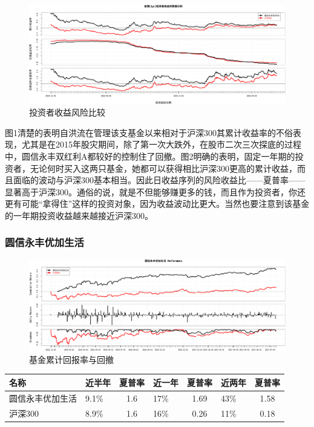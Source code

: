 \documentclass[hyperref,]{ctexart}
\begin{document}
\begin{figure}[htbp]
\centering
\includegraphics{hongliu-details_files/figure-latex/unnamed-chunk-3-1.pdf}
\caption{投资者收益风险比较}
\end{figure}

图1清楚的表明自洪流在管理该支基金以来相对于沪深300其累计收益率的不俗表现，尤其是在2015年股灾期间，除了第一次大跌外，在股市二次三次探底的过程中，圆信永丰双红利A都较好的控制住了回撤。图2明确的表明，固定一年期的投资者，无论何时买入这两只基金，她都可以获得相比沪深300更高的累计收益，而且面临的波动与沪深300基本相当。因此日收益序列的风险收益比------夏普率------显著高于沪深300。通俗的说，就是不但能够赚更多的钱，而且作为投资者，你还更有可能``拿得住''这样的投资对象，因为收益波动比更大。当然也要注意到该基金的一年期投资收益越来越接近沪深300。

\subsubsection{圆信永丰优加生活}

\begin{figure}[htbp]
\centering
\includegraphics{hongliu-details_files/figure-latex/unnamed-chunk-4-1.pdf}
\caption{基金累计回报率与回撤}
\end{figure}

\begin{longtable}[]{@{}llclclc@{}}
\toprule
名称 & 近半年 & 夏普率 & 近一年 & 夏普率 & 近两年 &
夏普率\tabularnewline
\midrule
\endhead
圆信永丰优加生活 & 9.1\% & 1.6 & 17\% & 1.69 & 43\% &
1.58\tabularnewline
沪深300 & 8.9\% & 1.6 & 16\% & 0.26 & 11\% & 0.18\tabularnewline
\bottomrule
\end{longtable}
\end{document}
